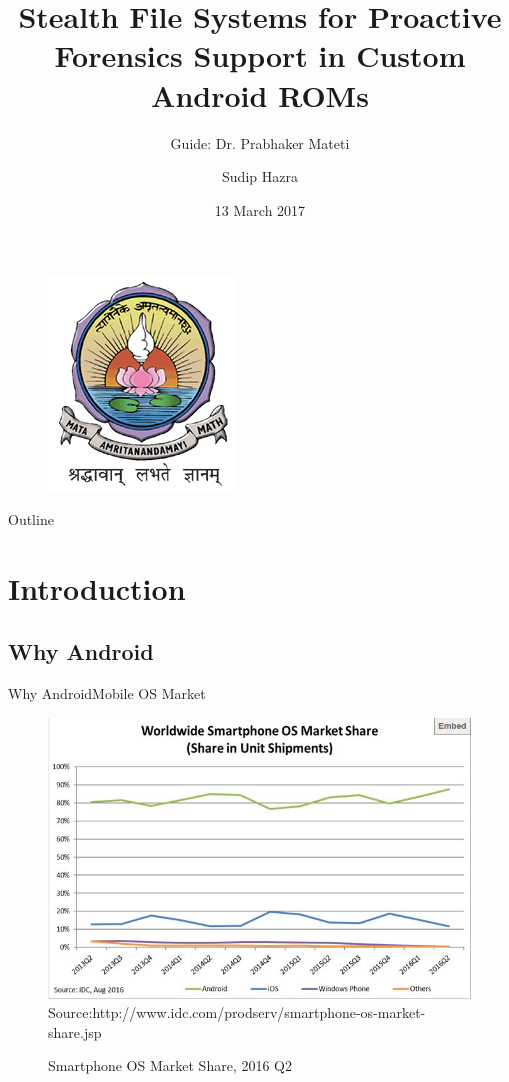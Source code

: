 \documentclass{beamer}
\title{Stealth File Systems for Proactive Forensics Support in Custom Android ROMs}
\author{Guide: Dr. Prabhaker Mateti\inst{1} \and Sudip Hazra\inst{2}}
\institute[Universities of Somewhere and Elsewhere] %
{
  \inst{1}%
  Wright State University
  \and
  \inst{2}%
  Amrita Centre For Cyber Security Systems and Networks\\
 Amrita University}
\date{13 March 2017}
\begin{document}
\begin{frame}
  \titlepage
  \centering
 
  \begin{figure}
  \centering
 \vspace{-.5cm}
  \includegraphics[width=.3\textwidth,height=.3\textheight]{images/AVV_colour}
  
  \end{figure}
  
 
\end{frame}

\begin{frame}{Outline}
  
  \begin{multicols}{3}
    \tableofcontents
  \end{multicols}
  
\end{frame}

\section{Introduction}

\subsection{Why Android}
\begin{frame}{Why Android}{Mobile OS Market}
\begin{figure}
\centering
\caption{Smartphone OS Market Share, 2016 Q2
}
\includegraphics[width=.6\textwidth,height=.5\textheight]{images/idc}
\label{imageLabel}
 \scriptsize{Source:http://www.idc.com/prodserv/smartphone-os-market-share.jsp}
\end{figure}

  
\end{frame}
\end{document}
